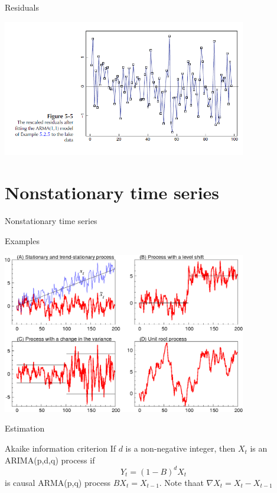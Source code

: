 \documentclass[11pt]{beamer}
\begin{document}
\begin{frame}{Residuals \cite{brockwell2002introduction}}
    \begin{center}
     \includegraphics[width=0.8\textwidth]{Pic/Residuals.png}
    \end{center}
\end{frame}

\section{Nonstationary time series}
\begin{frame}
\begin{center}
\Huge
Nonstationary time series
\end{center}
\end{frame}

\begin{frame}{Examples \cite{brockwell2002introduction,ur}}
    \begin{center}
     \includegraphics[width=0.8\textwidth]{Pic/unit_root_ts.png}
    \end{center}
\end{frame}

\begin{frame}{Estimation \cite{brockwell2002introduction}}
\begin{alertblock}{Akaike information criterion}
If $d$ is a non-negative integer, then ${X_{t}}$ is an ARIMA(p,d,q) process if 
\begin{equation*}
Y_{t}=(1-B)^{d}X_{t}
\end{equation*}
is causal ARMA(p,q) process $BX_{t}=X_{t-1}$. Note thaat $\nabla X_{t}=X_{t}-X_{t-1}$
\end{alertblock}
\end{frame}
\end{document}
